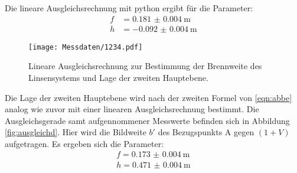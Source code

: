 Die lineare Ausgleichsrechnung mit python ergibt für die Parameter:
\begin{align}
	f &= \SI{0.181(4)}{\meter} \\
	h &= -\SI{0.092(4)}{\meter}
\end{align}

\begin{figure}
  \centering
  \texttt{[image: Messdaten/1234.pdf]}
  \caption{Lineare Ausgleichsrechnung zur Bestimmung der Brennweite des Linsensystems und Lage der zweiten Hauptebene.}
  \label{fig:ausgleichd2}
\end{figure}



Die Lage der zweiten Hauptebene wird nach der zweiten Formel von \eqref{eqn:abbe} analog wie 
zuvor mit einer linearen Ausgleichsrechnung bestimmt.
Die Ausgleichsgerade samt aufgennommener Messwerte befinden sich in Abbildung \ref{fig:ausgleichd}. Hier wird die Bildweite $b'$ des Bezugspunkts A gegen $(1+V)$ aufgetragen.
Es ergeben sich die Parameter:
\begin{align}
	f = \SI{0.173(4)}{\meter}   \\
	h = \SI{0.471(4)}{\meter}
\end{align}



